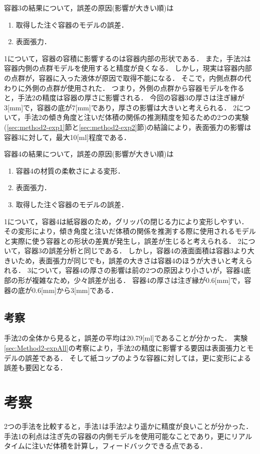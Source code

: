         容器3の結果について，誤差の原因(影響が大きい順)は
        	\begin{enumerate}
    		\item 取得した注ぐ容器のモデルの誤差．
    		\item 表面張力．
		    \end{enumerate}
		1について，容器の容積に影響するのは容器内部の形状である．
		また，手法2は容器内側の点群モデルを使用すると精度が良くなる．
		しかし，現実は容器内部の点群が，容器に入った液体が原因で取得不能になる．
		そこで，内側点群の代わりに外側の点群が使用された．
		つまり，外側の点群から容器モデルを作ると，手法2の精度は容器の厚さに影響される．
		今回の容器3の厚さは注ぎ縁が3[mm]で，容器の底が7[mm]であり，厚さの影響は大きいと考えられる．
		2について，手法2の傾き角度と注いだ体積の関係の推測精度を知るための2つの実験(\ref{sec:method2-exp1}節と\ref{sec:method2-exp2}節)の結論により，表面張力の影響は容器3に対して，最大10[ml]程度である．
    		
        容器4の結果について，誤差の原因(影響が大きい順)は
        \begin{enumerate}
		\item 容器4の材質の柔軟さによる変形．
		\item 表面張力．
		\item 取得した注ぐ容器のモデルの誤差．
		\end{enumerate}
		1について，容器4は紙容器のため，グリッパの閉じる力により変形しやすい．
		その変形により，傾き角度と注いだ体積の関係を推測する際に使用されるモデルと実際に使う容器との形状の差異が発生し，誤差が生じると考えられる．
		2について，容器3の誤差分析と同じである．
		しかし，容器4の液面面積は容器3より大きいため，表面張力が同じでも，誤差の大きさは容器4のほうが大きいと考えられる．
		3について，容器4の厚さの影響は前の2つの原因より小さいが，容器4底部の形が複雑なため，少々誤差が出る．
		容器4の厚さは注ぎ縁が0.6[mm]で，容器の底が0.6[mm]から3[mm]である．
        
    \subsection{考察}  
    手法2の全体から見ると，誤差の平均は20.79[ml]であることが分かった．
    実験\ref{sec:Method2-expAll}の考察により，手法2の精度に影響する要因は表面張力とモデルの誤差である．
    そして紙コップのような容器に対しては，更に変形による誤差も要因となる．
        
\section{考察}
2つの手法を比較すると，手法1は手法2より遥かに精度が良いことが分かった．
手法1の利点は注ぎ先の容器の内側モデルを使用可能なことであり，更にリアルタイムに注いだ体積を計算し，フィードバックできる点である．



